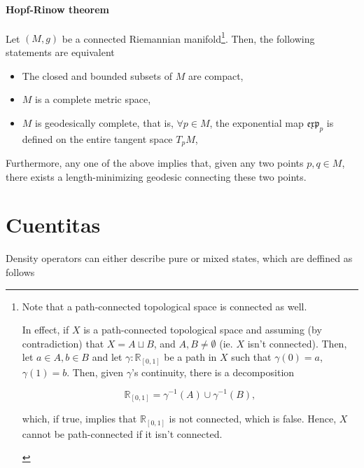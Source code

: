 \documentclass{homework}
\begin{document}
\paragraph{\textbf{Hopf-Rinow theorem}}

Let $(M,g)$ be a connected Riemannian manifold\footnote{Note that a path-connected topological space is connected as well. 
\begin{tcolorbox}[title=Proof: path-connectedness implies connectedness]
In effect, if $X$ is a path-connected topological space and assuming (by contradiction) that $X = A \sqcup B$, and $A, B \neq \emptyset$ (ie. $X$ isn't connected). Then, let $a \in A, b \in B$ and let $\gamma: \mathds{R}_{[0,1]}$ be a path in $X$ such that $\gamma(0) = a$, $\gamma(1) = b$. Then, given $\gamma$'s continuity, there is a decomposition 

$$
    \mathds{R}_{[0,1]} = \gamma^{-1}(A) \cup \gamma^{-1}(B),
$$

which, if true, implies that $\mathds{R}_{[0,1]}$ is not connected, which is false. Hence, $X$ cannot be path-connected if it isn't connected.
\end{tcolorbox}}. Then, the following statements are equivalent

\begin{itemize}
    \item The closed and bounded subsets of $M$ are compact,
    \item $M$ is a complete metric space, 
    \item $M$ is geodesically complete, that is, $\forall p \in M$, the exponential map $\mathfrak{e}\mathfrak{x}\mathfrak{p}_{p}$ is defined on the entire tangent space $T_p M$,
\end{itemize}

Furthermore, any one of the above implies that, given any two points $p, q \in M$, there exists a length-minimizing geodesic connecting these two points. \\

\section{Cuentitas}

Density operators can either describe pure or mixed states, which are deffined as follows 
\end{document}
